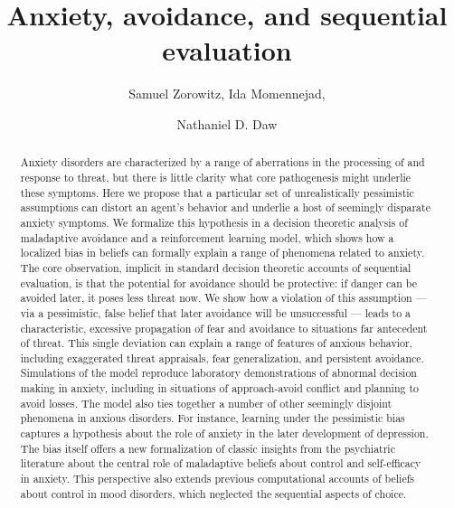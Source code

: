 \documentclass[manuscript]{stjour}
\begin{document}
\title{Anxiety, avoidance, and sequential evaluation}

\author[Author Names]
{Samuel Zorowitz, Ida Momennejad, \and Nathaniel D. Daw}






\begin{abstract}
Anxiety disorders are characterized by a range of aberrations in the processing of and response to threat, but there is little clarity what core pathogenesis might underlie these symptoms. Here we propose that a particular set of unrealistically pessimistic assumptions can distort an agent's behavior and underlie a host of seemingly disparate anxiety symptoms. We formalize this hypothesis in a decision theoretic analysis of maladaptive avoidance and a reinforcement learning model, which shows how a localized bias in beliefs can formally explain a range of phenomena related to anxiety. The core observation, implicit in standard decision theoretic accounts of sequential evaluation, is that the potential for avoidance should be protective: if danger can be avoided later, it poses less threat now. We show how a violation of this assumption --- via a pessimistic, false belief that later avoidance will be unsuccessful --- leads to a characteristic, excessive propagation of fear and avoidance to situations far antecedent of threat. This single deviation can explain a range of features of anxious behavior, including exaggerated threat appraisals, fear generalization, and persistent avoidance. Simulations of the model reproduce laboratory demonstrations of abnormal decision making in anxiety, including in situations of approach-avoid conflict and planning to avoid losses. The model also ties together a number of other seemingly disjoint phenomena in anxious disorders. For instance, learning under the pessimistic bias captures a hypothesis about the role of anxiety in the later development of depression. The bias itself offers a new formalization of classic insights from the psychiatric literature about the central role of maladaptive beliefs about control and self-efficacy in anxiety. This perspective also extends previous computational accounts of beliefs about control in mood disorders, which neglected the sequential aspects of choice.
\end{abstract}
\end{document}
